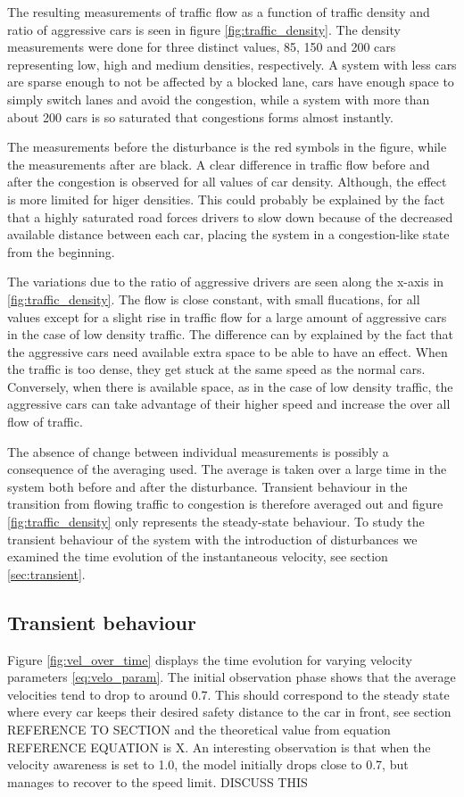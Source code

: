 \documentclass[11pt,a4paper,twocolumn]{article}
\begin{document}
 The resulting measurements of traffic flow as a function of traffic density and ratio of aggressive cars is seen in figure \ref{fig:traffic_density}. The density measurements were done for three distinct values, 85, 150 and 200 cars representing low, high and medium densities, respectively. A system with less cars are sparse enough to not be affected by a blocked lane, cars have enough space to simply switch lanes and avoid the congestion, while a system with more than about 200 cars is so saturated that congestions forms almost instantly.
 
 The measurements before the disturbance is the red symbols in the figure, while the measurements after are black. A clear difference in traffic flow before and after the congestion is observed for all values of car density. Although, the effect is more limited for higer densities. This could probably be explained by the fact that a highly saturated road forces drivers to slow down because of the decreased available distance between each car, placing the system in a congestion-like state from the beginning.

 The variations due to the ratio of aggressive drivers are seen along the x-axis in \ref{fig:traffic_density}. The flow is close constant, with small flucations, for all values except for a slight rise in traffic flow for a large amount of aggressive cars in the case of low density traffic. The difference can by explained by the fact that the aggressive cars need available extra space to be able to have an effect. When the traffic is too dense, they get stuck at the same speed as the normal cars. Conversely, when there is available space, as in the case of low density traffic, the aggressive cars can take advantage of their higher speed and increase the over all flow of traffic.  

 The absence of change between individual measurements is possibly a consequence of the averaging used. The average is taken over a large time in the system both before and after the disturbance. Transient behaviour in the transition from flowing traffic to congestion is therefore averaged out and figure \ref{fig:traffic_density} only represents the steady-state behaviour. To study the transient behaviour of the system with the introduction of disturbances we examined the time evolution of the instantaneous velocity, see section \ref{sec:transient}. 

\subsection{Transient behaviour}
Figure \ref{fig:vel_over_time} displays the time evolution for varying velocity parameters \eqref{eq:velo_param}. The initial observation phase shows that the average velocities tend to drop to around 0.7.
This should correspond to the steady state where every car keeps their desired safety distance to the car in front, see section REFERENCE TO SECTION and the theoretical value from equation REFERENCE EQUATION is X.
An interesting observation is that when the velocity awareness is set to 1.0, the model initially drops close to 0.7, but manages to recover to the speed limit. DISCUSS THIS
\end{document}

